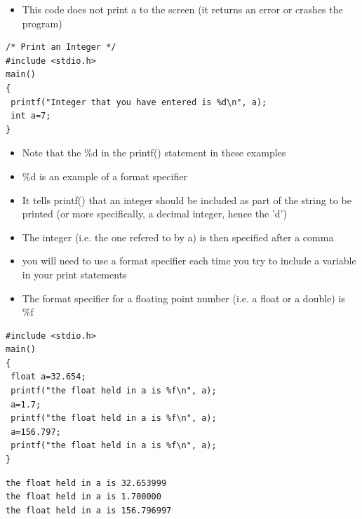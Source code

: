 \documentclass{beamer}
\begin{document}
\begin{frame}[fragile]
\begin{itemize}
\item This code does not print a to the screen (it returns an error or crashes the program)
\end{itemize}
\begin{block}{}
\begin{lstlisting}
/* Print an Integer */
#include <stdio.h>
main()
{
 printf("Integer that you have entered is %d\n", a);
 int a=7;
}
\end{lstlisting}
\end{block}

\end{frame}


\begin{frame}[fragile]
\begin{itemize}
\item Note that the \%d in the printf() statement in these examples
\item \%d is an example of a format specifier
\item It tells printf() that an integer should be included as part of the string to be printed (or more specifically, a decimal integer, hence the 'd')
\item The integer (i.e. the one refered to by a) is then specified after a comma
\item you will need to use a format specifier each time you try to include a variable in your print statements
\end{itemize}

\end{frame}

\begin{frame}[fragile]
\begin{itemize}
\item The format specifier for a floating point number (i.e. a float or a double) is \%f
\end{itemize}
\begin{block}{}
\begin{lstlisting}
#include <stdio.h>
main()
{
 float a=32.654;
 printf("the float held in a is %f\n", a);
 a=1.7;
 printf("the float held in a is %f\n", a);
 a=156.797;
 printf("the float held in a is %f\n", a);
}
\end{lstlisting}
\end{block}

\begin{block}{}
\begin{lstlisting}
the float held in a is 32.653999
the float held in a is 1.700000
the float held in a is 156.796997
\end{lstlisting}
\end{block}

\end{frame}
\end{document}
